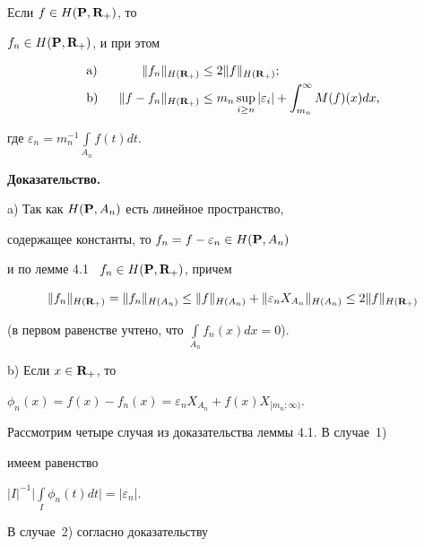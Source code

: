 \begin{lems}


Если $f\in H({\bold P},{\bold R}_+)$, то


$f_n\in H({\bold P},{\bold R}_+)$, и при этом 


\begin{alignat*}{2}


&\mathrm a) &\ \ \|f_n\|_{H({\bold R}_+)}&\leq 2\|f\|_{H({\bold R}_+)};\\


%


&\mathrm b) & \ \ \|f-f_n\|_{H({\bold R}_+)}


&\leq m_n\sup_{i\geq n}|\varepsilon_i|+\int^{\infty}_{m_n}M(f)(x)dx,


\end{alignat*}


где $\varepsilon_n=m_n^{-1}\int\limits_{A_n}f(t)dt$. 


\end{lems}








{\bf Доказательство.}


a) Так как $H({\bold P},A_n)$ есть линейное пространство, 


содержащее константы, то $f_n=f-\varepsilon_n\in H({\bold P},A_n)$


и по лемме 4.1 \ $f_n\in H({\bold P},{\bold R}_+)$, причем


$$


\|f_n\|_{H({\bold R}_+)}=\|f_n\|_{H(A_n)}\leq


\|f\|_{H(A_n)}+\|\varepsilon_nX_{A_n}\|_{H(A_n)}


\leq 2\|f\|_{H({\bold R}_+)}


$$


(в первом равенстве учтено, что $\int\limits_{A_n}f_n(x)dx=0$).





b) Если $x\in\bold R_+$, то


$\phi_n(x)=f(x)-f_n(x)=\varepsilon_nX_{A_n}+f(x)X_{[m_n;\infty)}$.


Рассмотрим четыре случая из доказательства леммы 4.1. В случае~1)


имеем равенство


$|I|^{-1}\Big|\int\limits_I\phi_n(t)dt\Big|=|\varepsilon_n|$.


В случае~2) согласно доказательству 


